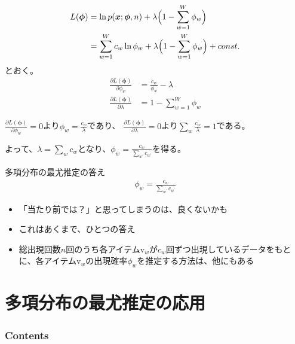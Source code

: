 \documentclass[aspectratio=169,unicode,dvipdfmx,14pt]{beamer}
\begin{document}
\begin{frame}
\FontMath
\begin{align}
L(\bm{\phi}) & = \ln p(\bm{x};\bm{\phi},n) + \lambda \Big( 1 - \sum_{w=1}^W \phi_w \Big)
\notag \\
& = \sum_{w=1}^W c_w\ln\phi_w  + \lambda \Big( 1 - \sum_{w=1}^W \phi_w \Big) + const.
\end{align}
とおく。
\begin{align}
\frac{\partial L(\bm{\phi})}{\partial \phi_w} & = \frac{c_w}{\phi_w} - \lambda \\
\frac{\partial L(\bm{\phi})}{\partial \lambda} & = 1 - \sum_{w=1}^W \phi_w
\end{align}

$\frac{\partial L(\bm{\phi})}{\partial \phi_w} = 0$より$\phi_w = \frac{c_w}{\lambda}$であり、
$\frac{\partial L(\bm{\phi})}{\partial \lambda} = 0$より$\sum_w \frac{c_w}{\lambda} = 1$である。

よって、$\lambda = \sum_w c_w$となり、$\phi_w = \frac{c_w}{\sum_{w^\prime} c_{w^\prime}}$を得る。
\end{frame}

\begin{frame}{多項分布の最尤推定の答え}
\begin{align}
\phi_w = \frac{c_w}{\sum_{w^\prime} c_{w^\prime}}
\end{align}
\begin{itemize}
\item 「当たり前では？」と思ってしまうのは、良くないかも
\item これはあくまで、ひとつの答え
\item 総出現回数$n$回のうち各アイテム$\mbox{v}_w$が$c_w$回ずつ出現しているデータをもとに、各アイテム$\mbox{v}_w$の出現確率$\phi_w$を推定する方法は、他にもある
\end{itemize}
\end{frame}

\section{多項分布の最尤推定の応用}

\begin{frame}\frametitle{Contents}
\Large \tableofcontents[currentsection]
\end{frame}
\end{document}
